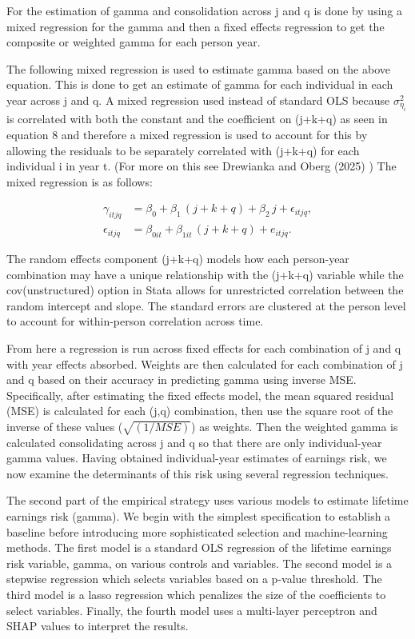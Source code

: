 \documentclass[12pt]{article}
\begin{document}
\begin{onehalfspace}
For the estimation of gamma and consolidation across j and q is done by using a mixed regression for the gamma and then a fixed effects regression to get the composite or weighted gamma for each person year.

The following mixed regression is used to estimate gamma based on the above equation. This is done to get an estimate of gamma for each individual in each year across j and q. A mixed regression used instead of standard OLS because $\sigma^2_{\eta_i}$ is correlated with both the constant and the coefficient on (j+k+q) as seen in equation 8 and therefore a mixed regression is used to account for this by allowing the residuals to be separately correlated with (j+k+q) for each individual i in year t. (For more on this see Drewianka and Oberg (2025) \cite{drewianka2025}) The mixed regression is as follows:


\vspace{-0.75cm}



\begin{align}
\gamma_{itjq}
&= \beta_{0}
  + \beta_{1}\,(j + k + q)
  + \beta_{2}\,j
  + \epsilon_{itjq}, \\[1ex]
\epsilon_{itjq}
&= \beta_{0it}
  + \beta_{1it}\,(j + k + q)
  + e_{itjq}.
\end{align}

The random effects component (j+k+q) models how each person-year combination may have a unique relationship with the (j+k+q) variable while the cov(unstructured) option in Stata allows for unrestricted correlation between the random intercept and slope. The standard errors are clustered at the person level to account for within-person correlation across time.

From here a regression is run across fixed effects for each combination of j and q with year effects absorbed. Weights are then calculated for each combination of j and q based on their accuracy in predicting gamma using inverse MSE. Specifically, after estimating the fixed effects model, the mean squared residual (MSE) is calculated for each (j,q) combination, then use the square root of the inverse of these values ($\sqrt{(1/MSE)}$) as weights. Then the weighted gamma is calculated consolidating across j and q so that there are only individual-year gamma values. Having obtained individual-year estimates of earnings risk, we now examine the determinants of this risk using several regression techniques.

The second part of the empirical strategy uses various models to estimate lifetime earnings risk (gamma). We begin with the simplest specification to establish a baseline before introducing more sophisticated selection and machine-learning methods. The first model is a standard OLS regression of the lifetime earnings risk variable, gamma, on various controls and variables. The second model is a stepwise regression which selects variables based on a p-value threshold. The third model is a lasso regression which penalizes the size of the coefficients to select variables. Finally, the fourth model uses a multi-layer perceptron and SHAP values to interpret the results.


\end{onehalfspace}
\end{document}
